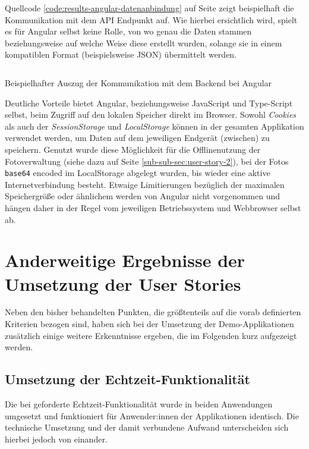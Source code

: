 \documentclass[a4paper,12pt,twoside]{scrreprt}
\begin{document}
Quellcode \ref{code:results-angular-datenanbindung} auf Seite \pageref{code:results-angular-datenanbindung} zeigt beispielhaft die Kommunikation mit dem  API Endpunkt auf. Wie hierbei ersichtlich wird, spielt es für Angular selbst keine Rolle, von wo genau die Daten stammen beziehungsweise auf welche Weise diese erstellt wurden, solange sie in einem kompatiblen Format (beispielsweise \acs{JSON}) übermittelt werden.

\begin{listing}[ht]
    \renewcommand{\fcolorbox}[4][]{#4}
    \inputminted[fontsize=\footnotesize,linenos,breaklines]{js}{code/Luidold_Results-Angular-Datenanbindung-CodeSample.ts}
    \caption[Beispielhafter Auszug der Kommunikation mit dem Backend bei Angular]{Beispielhafter Auszug der Kommunikation mit dem Backend bei Angular}
    \label{code:results-angular-datenanbindung}
\end{listing}

Deutliche Vorteile bietet Angular, beziehungsweise JavaScript und Type-Script selbst, beim Zugriff auf den lokalen Speicher direkt im Browser. Sowohl \textit{Cookies} als auch der \textit{SessionStorage} und \textit{LocalStorage} können in der gesamten Applikation verwendet werden, um Daten auf dem jeweiligen Endgerät (zwischen) zu speichern. Genutzt wurde diese Möglichkeit für die Offlinenutzung der Fotoverwaltung (siehe dazu \textit{} auf Seite \ref{sub-sub-sec:user-story-2}), bei der Fotos \texttt{base64} encoded im LocalStorage abgelegt wurden, bis wieder eine aktive Internetverbindung besteht. Etwaige Limitierungen bezüglich der maximalen Speichergröße oder ähnlichem werden von Angular nicht vorgenommen und hängen daher in der Regel vom jeweiligen Betriebssystem und Webbrowser selbst ab.

\section{Anderweitige Ergebnisse der Umsetzung der User Stories}
\label{sec:results-user-stories}
Neben den bisher behandelten Punkten, die größtenteils auf die vorab definierten Kriterien bezogen sind, haben sich bei der Umsetzung der Demo-Applikationen zusätzlich einige weitere Erkenntnisse ergeben, die im Folgenden kurz aufgezeigt werden.

\subsection{Umsetzung der Echtzeit-Funktionalität}
\label{sub-sec:results-user-stories-echtzeit}
Die bei \textit{} geforderte Echtzeit-Funktionalität wurde in beiden Anwendungen umgesetzt und funktioniert für Anwender:innen der Applikationen identisch. Die technische Umsetzung und der damit verbundene Aufwand unterscheiden sich hierbei jedoch von einander.
\end{document}
